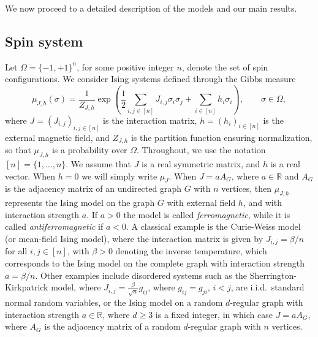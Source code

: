 \documentclass[11pt,reqno]{amsart}
\numberwithin{equation}{section}
\numberwithin{figure}{section}
\newcommand{\1}{\mathds{1}}
\newcommand{\bbR}{{\ensuremath{\mathbb R}} }
\begin{document}



We now proceed to a detailed description of the models and our main results.


\subsection{Spin system}
Let \(\Omega = \{-1, +1\}^n\), for some positive integer $n$, denote the set of spin configurations. 
We consider Ising systems defined through the Gibbs measure
\begin{equation}\label{Ising Model def}
    \mu_{J,h}(\sigma) = \frac{1}{Z_{J,h}} \exp\left(  \textstyle{\frac{1}{2}\sum_{i,j \in [n]}} J_{i,j} \sigma_i \sigma_j +  \textstyle{\sum_{i\in [n]}} h_i \sigma_i \right),\qquad \sigma\in\Omega,
\end{equation}
where \(J = (J_{i,j})_{i,j \in [n]}\) is the interaction matrix, \(h = (h_i)_{i \in [n]}\) is the external magnetic field, and \(Z_{J,h}\) is the partition function ensuring normalization, so that $\mu_{J,h}$ is a probability over $\Omega$. Throughout, we use the notation $[n]=\{1,\dots,n\}$. 
We assume that \(J\) is a real symmetric matrix, and $h$ is a real vector. When \(h=0\) we will simply write \(\mu_J\).
When $J=a A_G$, where $a\in\bbR$ and $A_G$ is the adjacency matrix of an undirected graph $G$ with $n$ vertices, then $\mu_{J,h}$ represents the Ising model on the graph $G$ with external field $h$, and with interaction strength $a$. If $a>0$ the model is called \emph{ferromagnetic}, while it is called \emph{antiferromagnetic} if $a<0$. 
A classical example is the Curie-Weiss model (or mean-field Ising model), where the interaction matrix is given by \(J_{i,j} = \beta/n\) for all \(i,j \in [n]\), with \(\beta > 0\) denoting the inverse temperature, which corresponds to the Ising model on the complete graph with interaction strength $a=\beta/n$. Other examples include disordered systems such as the Sherrington-Kirkpatrick model, where $J_{i,j}=\frac{\beta}{\sqrt n} g_{ij}$, where $g_{ij}=g_{ji}$, $i<j$, are i.i.d.\ standard normal random variables, or the Ising model on a random $d$-regular graph with interaction strength $a\in\bbR$, where $d\ge 3$ is a fixed integer, in which case $J=a A_G$, where $A_G$ is the adjacency matrix of a random  $d$-regular graph with $n$ vertices. 
\end{document}
